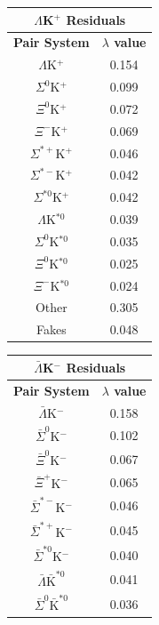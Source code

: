 \documentclass[../AnalysisNoteJBuxton.tex]{subfiles}
\begin{document}
\begin{table}[htbp]
 \centering
 \begin{minipage}{0.3\textwidth}
  \centering 
  \begin{tabular}{|c|c|}
   \multicolumn{2}{c}{$\Lambda$K$^{+}$ Residuals} \\
   \hline
   \textbf{Pair System} & \textbf{$\lambda$ value} \\
   \hline
   $\Lambda$K$^{+}$ & 0.154 \\
   $\Sigma^{0}$K$^{+}$ & 0.099 \\
   $\Xi^{0}$K$^{+}$ & 0.072 \\
   $\Xi^{-}$K$^{+}$ & 0.069 \\
   $\Sigma^{*+}$K$^{+}$ & 0.046 \\
   $\Sigma^{*-}$K$^{+}$ & 0.042 \\
   $\Sigma^{*0}$K$^{+}$ & 0.042 \\
   $\Lambda$K$^{*0}$ & 0.039 \\
   $\Sigma^{0}$K$^{*0}$ & 0.035 \\
   $\Xi^{0}$K$^{*0}$ & 0.025 \\
   $\Xi^{-}$K$^{*0}$ & 0.024 \\
   Other & 0.305 \\
   Fakes & 0.048 \\
   \hline
  \end{tabular}
 \end{minipage} 
 \begin{minipage}{0.3\textwidth}
  \centering 
  \begin{tabular}{|c|c|}
   \multicolumn{2}{c}{$\bar{\Lambda}$K$^{-}$ Residuals} \\
   \hline
   \textbf{Pair System} & \textbf{$\lambda$ value} \\
   \hline
   $\bar{\Lambda}$K$^{-}$ & 0.158 \\
   $\bar{\Sigma}^{0}$K$^{-}$ & 0.102 \\
   $\bar{\Xi}^{0}$K$^{-}$ & 0.067 \\
   $\bar{\Xi}^{+}$K$^{-}$ & 0.065 \\
   $\bar{\Sigma}^{*-}$K$^{-}$ & 0.046 \\
   $\bar{\Sigma}^{*+}$K$^{-}$ & 0.045 \\
   $\bar{\Sigma}^{*0}$K$^{-}$ & 0.040 \\
   $\bar{\Lambda}\bar{\mathrm{K}}^{*0}$ & 0.041 \\
   $\bar{\Sigma}^{0}\bar{\mathrm{K}}^{*0}$ & 0.036 \\

\end{tabular}
\end{minipage}
\end{table}
\end{document}
